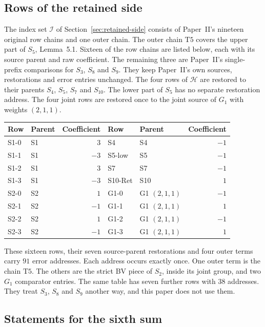 \subsection{Rows of the retained side}\label{subsec:app-retB-rows}

The index set $\mathcal I$ of Section~\ref{sec:retained-side} consists of
Paper~II's nineteen original row chains and one outer chain. The outer
chain $\mathrm{T5}$ covers the upper part of $S_5$, Lemma~5.1. Sixteen of the row
chains are listed below, each
with its source parent and raw coefficient. The remaining three are
Paper~II's single-prefix comparisons for $S_3$, $S_8$ and $S_9$. They keep
Paper~II's own sources, restorations and error entries unchanged.
The four rows of $\mathcal H$ are restored to their parents
$S_4$, $S_5$, $S_7$ and $S_{10}$. The lower part of $S_5$ has no separate
restoration address. The four joint rows are restored once to
the joint source of $G_1$ with weights $(2,1,1)$.
\begin{center}
\small
\begin{tabular}{@{}llr|llr@{}}
\hline
Row & Parent & Coefficient & Row & Parent & Coefficient\\
\hline
S1-0 & S1 & $3$ & S4 & S4 & $-1$\\
S1-1 & S1 & $-3$ & S5-low & S5 & $-1$\\
S1-2 & S1 & $3$ & S7 & S7 & $-1$\\
S1-3 & S1 & $-3$ & S10-Ret & S10 & $1$\\
S2-0 & S2 & $1$ & G1-0 & G1 $(2,1,1)$ & $-1$\\
S2-1 & S2 & $-1$ & G1-1 & G1 $(2,1,1)$ & $1$\\
S2-2 & S2 & $1$ & G1-2 & G1 $(2,1,1)$ & $-1$\\
S2-3 & S2 & $-1$ & G1-3 & G1 $(2,1,1)$ & $1$\\
\hline
\end{tabular}
\end{center}
These sixteen rows, their seven source-parent restorations and four outer
terms carry $91$ error addresses. Each address occurs exactly once. One
outer term is the chain $\mathrm{T5}$. The others are the strict BV piece of
$S_2$, inside its joint group, and two $G_1$ comparator entries. The
same table has seven further rows with $38$ addresses. They treat
$S_3$, $S_8$ and $S_9$ another way, and this paper does not use them.
\subsection{Statements for the sixth sum}\label{subsec:app-ra-rows}

